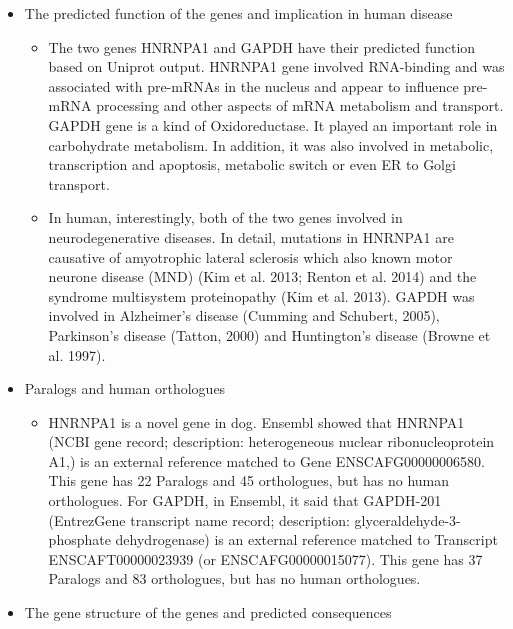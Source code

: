 \documentclass[11pt]{article}
\begin{document}
\begin{itemize}
\begin{itemize}
\item The predicted function of the genes and implication in human disease

\begin{itemize}
\item The two genes HNRNPA1 and GAPDH have their predicted function based on Uniprot output. HNRNPA1 gene involved RNA-binding and was associated with pre-mRNAs
      in the nucleus and appear to influence pre-mRNA processing and other aspects of mRNA metabolism and transport. GAPDH gene is a kind of Oxidoreductase.
      It played an important role in carbohydrate metabolism. In addition, it was also involved in metabolic, transcription and apoptosis, metabolic switch or even ER to Golgi transport.
\item In human, interestingly, both of the two genes involved in neurodegenerative diseases. In detail, mutations in HNRNPA1 are causative of amyotrophic lateral
      sclerosis which also known motor neurone disease (MND) (Kim et al. 2013; Renton et al. 2014) and the syndrome multisystem proteinopathy (Kim et al. 2013). GAPDH was involved in Alzheimer's disease (Cumming and Schubert, 2005),
      Parkinson's disease (Tatton, 2000) and Huntington's disease (Browne et al. 1997).
\end{itemize}

\item Paralogs and human orthologues

\begin{itemize}
\item HNRNPA1 is a novel gene in dog. Ensembl showed that HNRNPA1 (NCBI gene record; description: heterogeneous nuclear ribonucleoprotein A1,) is an external reference matched to Gene ENSCAFG00000006580.
      This gene has 22 Paralogs and 45 orthologues, but has no human orthologues. For GAPDH, in Ensembl, it said that GAPDH-201 (EntrezGene transcript name record; description: glyceraldehyde-3-phosphate dehydrogenase)
      is an external reference matched to Transcript ENSCAFT00000023939 (or ENSCAFG00000015077). This gene has 37 Paralogs and 83 orthologues, but has no human orthologues.
\end{itemize}

\item The gene structure of the genes and predicted consequences


\end{itemize}
\end{itemize}
\end{document}
